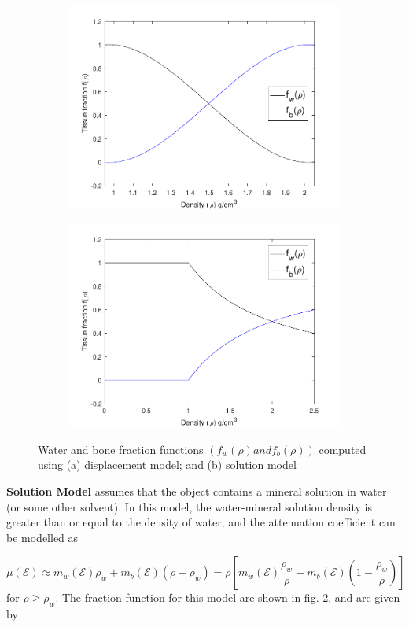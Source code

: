 \begin{figure}
\begin{subfigure}{.5\textwidth}
  \centering
  \includegraphics[width=3.1 in]{"displacementmodel"}
  \caption{}
  \label{displace}
\end{subfigure}%
\begin{subfigure}{.5\textwidth}
  \centering
  \includegraphics[width=3.1 in]{"solutionmodel"}
  \caption{}
  \label{solution}
\end{subfigure}
\caption{Water and bone fraction functions $\left( f_w(\rho) and f_b(\rho) \right)$ computed using (a) displacement model; and (b) solution model}
\label{fig3}
\end{figure}

\textbf{Solution Model} assumes that the object contains a mineral solution in water (or some other solvent). In this model, the water-mineral solution density is greater than or equal to the density of water, and the attenuation coefficient can be modelled as

\begin{equation}
\label{eq59}
\mu(\mathcal{E}) \approx  m_w(\mathcal{E}) \rho_{w} + m_b(\mathcal{E}) (\rho - \rho_w) = \rho \left[ m_w(\mathcal{E}) \frac{\rho_{w}}{\rho} + m_b(\mathcal{E}) (1 - \frac{\rho_w}{\rho})\right]
\end{equation} for $\rho \geq \rho_w$. The fraction function for this model are shown in fig. \ref{solution}, and are given by


